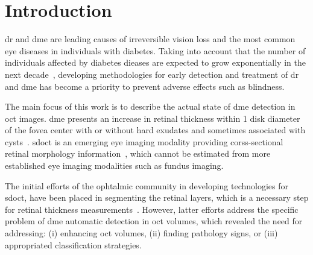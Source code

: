 \graphicspath{ {./content/intro/figures/} }

\section{Introduction}
\label{sec:intro}  %

\gls{dr} and \gls{dme} are leading causes of irreversible vision loss and the most common eye diseases in individuals with diabetes.
Taking into account that the number of individuals affected by diabetes dieases are expected to grow exponentially in the next decade~\cite{wild2004global},
developing methodologies for early detection and treatment of \gls{dr} and \gls{dme} has become a priority to prevent adverse effects such as blindness.

The main focus of this work is to describe the actual state of \gls{dme} detection in \gls{oct} images.
\gls{dme} presents an increase in retinal thickness within 1 disk diameter of the fovea center with or without hard exudates and sometimes associated with cysts~\cite{ETDRSG1985}.
\gls{sdoct} is an emerging eye imaging modality providing corss-sectional retinal morphology information~\cite{Wang2015}, which cannot be estimated from more established eye imaging modalities such as fundus imaging.

The initial efforts of the ophtalmic community in developing technologies for \gls{sdoct}, have been placed in segmenting the retinal layers, which is a necessary step for retinal thickness measurements~\cite{Chiu2010,Kafieh2013}.
However, latter efforts address the specific problem of \gls{dme} automatic detection in \gls{oct} volumes, which revealed the need for addressing: (i) enhancing \gls{oct} volumes, (ii) finding pathology signs, or (iii) appropriated classification strategies.

